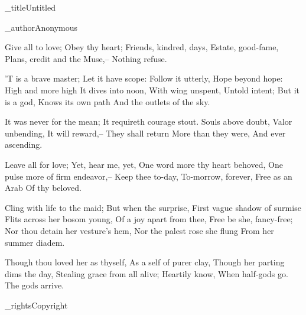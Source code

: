 \article_title{Untitled}

\article_author{Anonymous}
\begin{poem}
Give all to love;\verseline
Obey thy heart;\verseline
Friends, kindred, days,\verseline
Estate, good-fame,\verseline
Plans, credit and the Muse,--\verseline
Nothing refuse.
\begin{stanza}
'T is a brave master;\verseline
Let it have scope:\verseline
Follow it utterly,\verseline
Hope beyond hope:\verseline
High and more high\verseline
It dives into noon,\verseline
With wing unspent,\verseline
Untold intent;\verseline
But it is a god,\verseline
Knows its own path\verseline
And the outlets of the sky.
\end{stanza}
\begin{stanza}
It was never for the mean;\verseline
It requireth courage stout.\verseline
Souls above doubt,\verseline
Valor unbending,\verseline
It will reward,--\verseline
They shall return\verseline
More than they were,\verseline
And ever ascending.
\end{stanza}
\begin{stanza}
Leave all for love;\verseline
Yet, hear me, yet,\verseline
One word more thy heart behoved,\verseline
One pulse more of firm endeavor,--\verseline
Keep thee to-day,\verseline
To-morrow, forever,\verseline
Free as an Arab\verseline
Of thy beloved.
\end{stanza}
\begin{stanza}
Cling with life to the maid;\verseline
But when the surprise,\verseline
First vague shadow of surmise\verseline
Flits across her bosom young,\verseline
Of a joy apart from thee,\verseline
Free be she, fancy-free;\verseline
Nor thou detain her vesture's hem,\verseline
Nor the palest rose she flung\verseline
From her summer diadem.
\end{stanza}
\begin{stanza}
Though thou loved her as thyself,\verseline
As a self of purer clay,\verseline
Though her parting dims the day,\verseline
Stealing grace from all alive;\verseline
Heartily know,\verseline
When half-gods go.\verseline
The gods arrive.

\end{stanza}
\end{poem}

\article_rights{Copyright}
